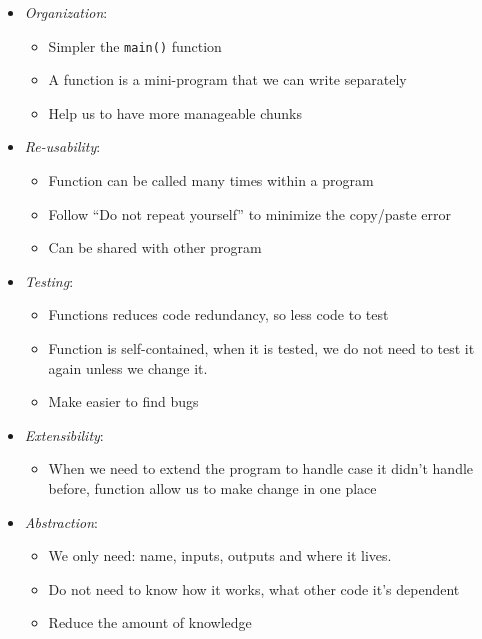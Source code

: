 \documentclass[
  letterpaper,
  DIV=11,
  numbers=noendperiod]{scrreprt}
\providecommand{\tightlist}{%
  \setlength{\itemsep}{0pt}\setlength{\parskip}{0pt}}\usepackage{longtable,booktabs,array}
\begin{document}
\begin{itemize}
\tightlist
\item
  \emph{Organization}:

  \begin{itemize}
  \tightlist
  \item
    Simpler the \texttt{main()} function
  \item
    A function is a mini-program that we can write separately
  \item
    Help us to have more manageable chunks
  \end{itemize}
\item
  \emph{Re-usability}:

  \begin{itemize}
  \tightlist
  \item
    Function can be called many times within a program
  \item
    Follow ``Do not repeat yourself'' to minimize the copy/paste error
  \item
    Can be shared with other program
  \end{itemize}
\item
  \emph{Testing}:

  \begin{itemize}
  \tightlist
  \item
    Functions reduces code redundancy, so less code to test
  \item
    Function is self-contained, when it is tested, we do not need to
    test it again unless we change it.
  \item
    Make easier to find bugs
  \end{itemize}
\item
  \emph{Extensibility}:

  \begin{itemize}
  \tightlist
  \item
    When we need to extend the program to handle case it didn't handle
    before, function allow us to make change in one place
  \end{itemize}
\item
  \emph{Abstraction}:

  \begin{itemize}
  \tightlist
  \item
    We only need: name, inputs, outputs and where it lives.
  \item
    Do not need to know how it works, what other code it's dependent
  \item
    Reduce the amount of knowledge
  \end{itemize}
\end{itemize}
\end{document}
